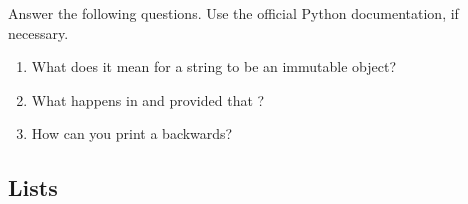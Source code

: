 \begin{problem}
Answer the following questions. Use the official Python documentation, if necessary.
\begin{enumerate}
\item What does it mean for a string to be an immutable object? 
\item What happens in  and  provided 
that ? 
\item How can you print a  backwards?
\end{enumerate}
\end{problem}

\subsection*{Lists}
